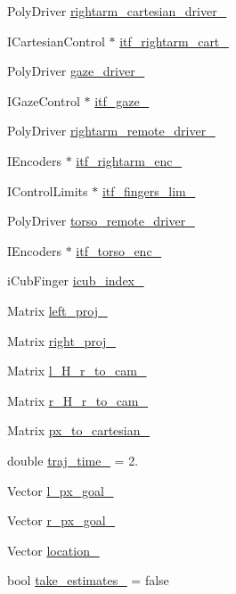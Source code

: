 \begin{DoxyCompactItemize}
Poly\+Driver \hyperlink{classRFMReaching_add6fb41068a3c05ebae8726873c7d73d}{rightarm\+\_\+cartesian\+\_\+driver\+\_\+}
\item 
I\+Cartesian\+Control $\ast$ \hyperlink{classRFMReaching_a5509b0b16426a661e71ae04991cd8553}{itf\+\_\+rightarm\+\_\+cart\+\_\+}
\item 
Poly\+Driver \hyperlink{classRFMReaching_ac8b09f0c704214af2cdd587b169b8240}{gaze\+\_\+driver\+\_\+}
\item 
I\+Gaze\+Control $\ast$ \hyperlink{classRFMReaching_a9d6ae2ac48ee9c5722b531c780245cf5}{itf\+\_\+gaze\+\_\+}
\item 
Poly\+Driver \hyperlink{classRFMReaching_ad7b97fed6938ffdd2e6752f5c9ae490c}{rightarm\+\_\+remote\+\_\+driver\+\_\+}
\item 
I\+Encoders $\ast$ \hyperlink{classRFMReaching_a0b9b00bc6c30770b4a12248538427864}{itf\+\_\+rightarm\+\_\+enc\+\_\+}
\item 
I\+Control\+Limits $\ast$ \hyperlink{classRFMReaching_ad99a31b38faf963ce1520f0215c3fdf3}{itf\+\_\+fingers\+\_\+lim\+\_\+}
\item 
Poly\+Driver \hyperlink{classRFMReaching_a0425996ad8eafc74f58fc8ac3db7fa85}{torso\+\_\+remote\+\_\+driver\+\_\+}
\item 
I\+Encoders $\ast$ \hyperlink{classRFMReaching_a67df5b7100117d56d535c2d4dbda72f1}{itf\+\_\+torso\+\_\+enc\+\_\+}
\item 
i\+Cub\+Finger \hyperlink{classRFMReaching_a7cc9d6f6b8bf8326e730beb1704cabc9}{icub\+\_\+index\+\_\+}
\item 
Matrix \hyperlink{classRFMReaching_a9fa03ef25eb3ad04fc6c86b642ee3e08}{left\+\_\+proj\+\_\+}
\item 
Matrix \hyperlink{classRFMReaching_a4f0aaee8537d19e7d347219d15382969}{right\+\_\+proj\+\_\+}
\item 
Matrix \hyperlink{classRFMReaching_af11a2468acda87e50de42410d80288b2}{l\+\_\+\+H\+\_\+r\+\_\+to\+\_\+cam\+\_\+}
\item 
Matrix \hyperlink{classRFMReaching_a351a3eef4730155f51d05af16b7406bf}{r\+\_\+\+H\+\_\+r\+\_\+to\+\_\+cam\+\_\+}
\item 
Matrix \hyperlink{classRFMReaching_a561ebfd0e4f966661b0c27326fec5d94}{px\+\_\+to\+\_\+cartesian\+\_\+}
\item 
double \hyperlink{classRFMReaching_ab8b1ebb26099043288c6b6da5fe7ee9b}{traj\+\_\+time\+\_\+} = 2.
\item 
Vector \hyperlink{classRFMReaching_a0438d9cd07623917e3dda5eecfa34e0e}{l\+\_\+px\+\_\+goal\+\_\+}
\item 
Vector \hyperlink{classRFMReaching_a062be56961b4942fe20dd89d59abcaef}{r\+\_\+px\+\_\+goal\+\_\+}
\item 
Vector \hyperlink{classRFMReaching_a6b7de70637791218bdabe94b9613da14}{location\+\_\+}
\item 
bool \hyperlink{classRFMReaching_a28c1640ff7f4c85524567355e689ac46}{take\+\_\+estimates\+\_\+} = false
\end{DoxyCompactItemize}


